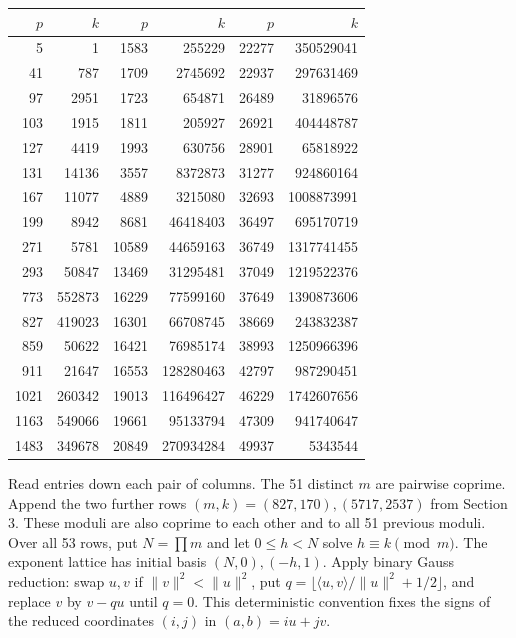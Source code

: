 \documentclass[11pt,a4paper,oneside,openany]{book}
\begin{document}
\begin{center}\scriptsize
\begin{tabular}{rr@{\qquad}rr@{\qquad}rr}
\hline
$p$&$k$&$p$&$k$&$p$&$k$\\\hline
5&1&1583&255229&22277&350529041\\
41&787&1709&2745692&22937&297631469\\
97&2951&1723&654871&26489&31896576\\
103&1915&1811&205927&26921&404448787\\
127&4419&1993&630756&28901&65818922\\
131&14136&3557&8372873&31277&924860164\\
167&11077&4889&3215080&32693&1008873991\\
199&8942&8681&46418403&36497&695170719\\
271&5781&10589&44659163&36749&1317741455\\
293&50847&13469&31295481&37049&1219522376\\
773&552873&16229&77599160&37649&1390873606\\
827&419023&16301&66708745&38669&243832387\\
859&50622&16421&76985174&38993&1250966396\\
911&21647&16553&128280463&42797&987290451\\
1021&260342&19013&116496427&46229&1742607656\\
1163&549066&19661&95133794&47309&941740647\\
1483&349678&20849&270934284&49937&5343544\\
\hline
\end{tabular}
\end{center}
Read entries down each pair of columns. The 51 distinct $m$ are pairwise
coprime. Append the two further rows $(m,k)=(827,170),(5717,2537)$ from Section 3. These moduli are also coprime to each other and to all 51 previous moduli. Over all 53 rows, put $N=\prod m$ and let $0\le h<N$ solve $h\equiv k\pmod m$.
The exponent lattice has initial basis $(N,0),(-h,1)$. Apply binary
Gauss reduction: swap $u,v$ if $\lVert v\rVert^2<\lVert u\rVert^2$,
put $q=\lfloor\langle u,v\rangle/\lVert u\rVert^2+1/2\rfloor$,
and replace $v$ by $v-qu$ until $q=0$. This deterministic convention fixes
the signs of the reduced coordinates $(i,j)$ in $(a,b)=iu+jv$.
\end{document}
